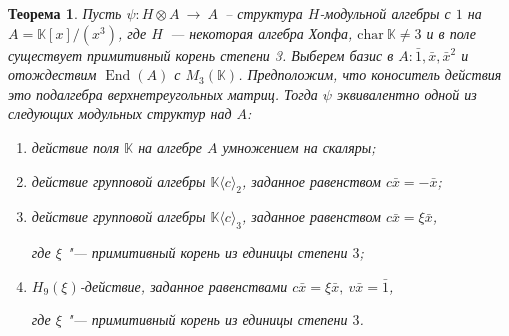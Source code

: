 \documentclass[12pt, reqno, a4paper, oneside, notitlepage]{amsart}
\theoremstyle{mytheoremstyle}
\newtheorem{theorem}{Теорема}[section]
\theoremstyle{myremarkstyle}
\numberwithin{equation}{section}
\DeclareMathOperator{\End}{End}
\begin{document}
\begin{theorem}
	Пусть $\psi:H \otimes A\ \to \ A $~-- структура $H$-модульной алгебры с $1$ на $A = \mathbb{K}[x]/(x^3)$, где $H$~--- некоторая алгебра Хопфа, $\mathrm{char} \ \mathbb{K} \neq 3$ и в поле существует примитивный корень степени 3. Выберем базис в $A: \bar 1, \bar x, \bar x^2$ и отождествим $\End(A)$ с $M_3(\mathbb{K})$. Предположим, что коноситель действия это подалгебра верхнетреугольных матриц. Тогда $\psi$ эквивалентно одной из следующих модульных структур над $A$:
    
    \begin{enumerate}
        \item действие поля $\mathbb{K}$ на алгебре $A$ умножением на скаляры; \label{scalar}
        
        \item действие групповой алгебры $\mathbb{K}\langle c\rangle_2$, заданное равенством 
        ${c\bar{x} = -\bar{x}}$; \label{eps=b^2}
        
        \item действие групповой алгебры $\mathbb{K}\langle c \rangle_3$, заданное равенством $c\bar{x} = \xi \bar{x}$,
        
        где $\xi$ "--- примитивный корень из единицы степени $3$;\label{diagonal} 
        
        \item $H_9(\xi)$-действие, заданное равенствами $c\bar{x}=\xi\bar{x},\ v\bar{x}= \bar{1}$, 
        
        где $\xi$ "--- примитивный корень из единицы степени $3$. \label{all}
        
    \end{enumerate}
\end{theorem}
\end{document}
